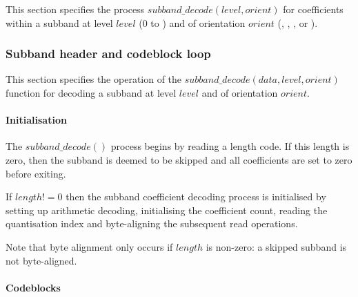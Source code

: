 \label{subbanddecodeprocess}

This section specifies the process $subband\_decode(level,orient)$ for coefficients
within a subband at level $level$ ($0$ to \TransformDepth) and of orientation $orient$
(\LL, \LH, \HL, or \HH). 

\subsubsection{Subband header and codeblock loop}

This section specifies the operation of the $subband\_decode(data, level, orient)$
function for decoding a subband at level $level$ and of orientation $orient$.

\paragraph{Initialisation\newline}

The $subband\_decode()$ process begins by reading a length code. If this length is
zero, then the subband is deemed to be skipped and all coefficients are set to zero
before exiting.


\begin{pseudo*}
    \bsEND
  \bsEND
  \bsRET{}
\bsEND
\end{pseudo*}

If $length!=0$ then the subband coefficient decoding process is initialised by
setting up arithmetic decoding, initialising the coefficient count, reading
the quantisation index and byte-aligning the subsequent read operations.

\begin{pseudo*}
\end{pseudo*}

Note that byte alignment only occurs if $length$ is non-zero: a skipped 
subband is not byte-aligned.

\paragraph{Codeblocks\newline}


